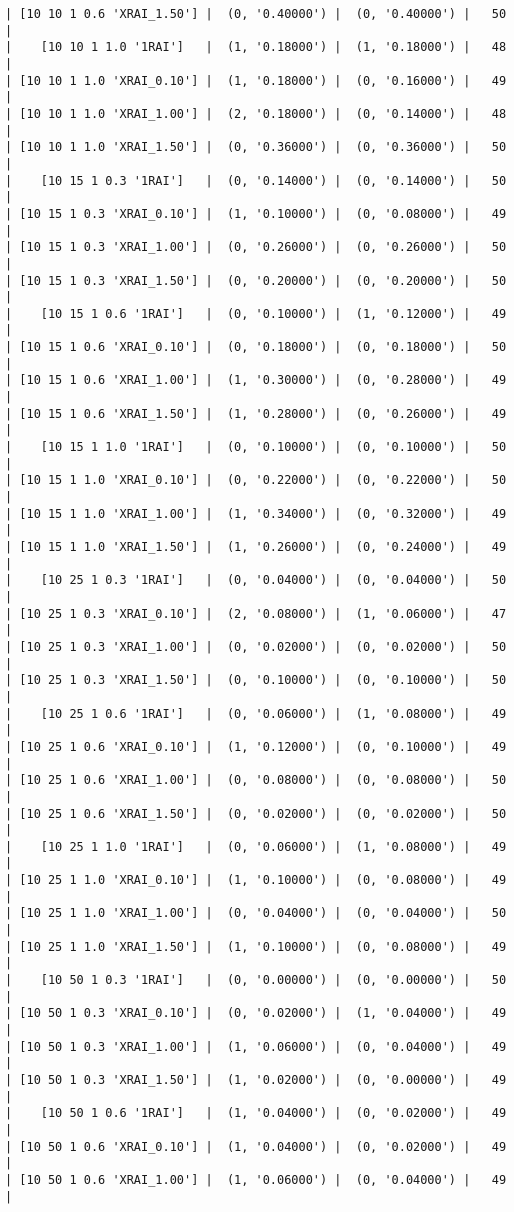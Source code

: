 \documentclass{article}
\begin{document}
\begin{verbatim}
| [10 10 1 0.6 'XRAI_1.50'] |  (0, '0.40000') |  (0, '0.40000') |   50  |
|    [10 10 1 1.0 '1RAI']   |  (1, '0.18000') |  (1, '0.18000') |   48  |
| [10 10 1 1.0 'XRAI_0.10'] |  (1, '0.18000') |  (0, '0.16000') |   49  |
| [10 10 1 1.0 'XRAI_1.00'] |  (2, '0.18000') |  (0, '0.14000') |   48  |
| [10 10 1 1.0 'XRAI_1.50'] |  (0, '0.36000') |  (0, '0.36000') |   50  |
|    [10 15 1 0.3 '1RAI']   |  (0, '0.14000') |  (0, '0.14000') |   50  |
| [10 15 1 0.3 'XRAI_0.10'] |  (1, '0.10000') |  (0, '0.08000') |   49  |
| [10 15 1 0.3 'XRAI_1.00'] |  (0, '0.26000') |  (0, '0.26000') |   50  |
| [10 15 1 0.3 'XRAI_1.50'] |  (0, '0.20000') |  (0, '0.20000') |   50  |
|    [10 15 1 0.6 '1RAI']   |  (0, '0.10000') |  (1, '0.12000') |   49  |
| [10 15 1 0.6 'XRAI_0.10'] |  (0, '0.18000') |  (0, '0.18000') |   50  |
| [10 15 1 0.6 'XRAI_1.00'] |  (1, '0.30000') |  (0, '0.28000') |   49  |
| [10 15 1 0.6 'XRAI_1.50'] |  (1, '0.28000') |  (0, '0.26000') |   49  |
|    [10 15 1 1.0 '1RAI']   |  (0, '0.10000') |  (0, '0.10000') |   50  |
| [10 15 1 1.0 'XRAI_0.10'] |  (0, '0.22000') |  (0, '0.22000') |   50  |
| [10 15 1 1.0 'XRAI_1.00'] |  (1, '0.34000') |  (0, '0.32000') |   49  |
| [10 15 1 1.0 'XRAI_1.50'] |  (1, '0.26000') |  (0, '0.24000') |   49  |
|    [10 25 1 0.3 '1RAI']   |  (0, '0.04000') |  (0, '0.04000') |   50  |
| [10 25 1 0.3 'XRAI_0.10'] |  (2, '0.08000') |  (1, '0.06000') |   47  |
| [10 25 1 0.3 'XRAI_1.00'] |  (0, '0.02000') |  (0, '0.02000') |   50  |
| [10 25 1 0.3 'XRAI_1.50'] |  (0, '0.10000') |  (0, '0.10000') |   50  |
|    [10 25 1 0.6 '1RAI']   |  (0, '0.06000') |  (1, '0.08000') |   49  |
| [10 25 1 0.6 'XRAI_0.10'] |  (1, '0.12000') |  (0, '0.10000') |   49  |
| [10 25 1 0.6 'XRAI_1.00'] |  (0, '0.08000') |  (0, '0.08000') |   50  |
| [10 25 1 0.6 'XRAI_1.50'] |  (0, '0.02000') |  (0, '0.02000') |   50  |
|    [10 25 1 1.0 '1RAI']   |  (0, '0.06000') |  (1, '0.08000') |   49  |
| [10 25 1 1.0 'XRAI_0.10'] |  (1, '0.10000') |  (0, '0.08000') |   49  |
| [10 25 1 1.0 'XRAI_1.00'] |  (0, '0.04000') |  (0, '0.04000') |   50  |
| [10 25 1 1.0 'XRAI_1.50'] |  (1, '0.10000') |  (0, '0.08000') |   49  |
|    [10 50 1 0.3 '1RAI']   |  (0, '0.00000') |  (0, '0.00000') |   50  |
| [10 50 1 0.3 'XRAI_0.10'] |  (0, '0.02000') |  (1, '0.04000') |   49  |
| [10 50 1 0.3 'XRAI_1.00'] |  (1, '0.06000') |  (0, '0.04000') |   49  |
| [10 50 1 0.3 'XRAI_1.50'] |  (1, '0.02000') |  (0, '0.00000') |   49  |
|    [10 50 1 0.6 '1RAI']   |  (1, '0.04000') |  (0, '0.02000') |   49  |
| [10 50 1 0.6 'XRAI_0.10'] |  (1, '0.04000') |  (0, '0.02000') |   49  |
| [10 50 1 0.6 'XRAI_1.00'] |  (1, '0.06000') |  (0, '0.04000') |   49  |

\end{verbatim}
\end{document}

